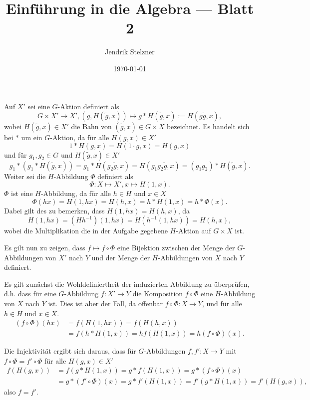 \documentclass[a4paper,10pt]{article}
\title{Einführung in die Algebra — Blatt 2}
\author{Jendrik Stelzner}
\date{\today}
\theoremstyle{definition}
\begin{document}
\maketitle





\section{}
Auf $X'$ sei eine $G$-Aktion definiert als
\[
 G \times X' \rightarrow X', (g,H(\tilde{g},x)) \mapsto g * H(\tilde{g},x) := H(g \tilde{g}, x),
\]
wobei $H(\tilde{g},x) \in X'$ die Bahn von $(\tilde{g},x) \in G \times X$ bezeichnet. Es handelt sich bei $*$ um ein $G$-Aktion, da für alle $H(g,x) \in X'$
\[
 1 * H(g,x) = H(1 \cdot g, x) = H(g,x)
\]
und für $g_1, g_2 \in G$ und $H(\tilde{g},x) \in X'$
\[
 g_1 * (g_1 * H(\tilde{g},x))
 = g_1 * H(g_2 \tilde{g}, x)
 = H(g_1 g_2 \tilde{g}, x)
 = (g_1 g_2) * H(\tilde{g},x).
\]
Weiter sei die $H$-Abbildung $\Phi$ definiert als
\[
 \Phi : X \mapsto X', x \mapsto H(1,x).
\]
$\Phi$ ist eine $H$-Abbildung, da für alle $h \in H$ und $x \in X$
\[
 \Phi(hx) = H(1,hx) = H(h,x) = h * H(1,x) = h * \Phi(x).
\]
Dabei gilt des zu bemerken, dass $H(1,hx) = H(h,x)$, da
\[
 H(1,hx) = (H h^{-1}) (1,hx) = H (h^{-1}(1,hx)) = H(h,x),
\]
wobei die Multiplikation die in der Aufgabe gegebene $H$-Aktion auf $G \times X$ ist.

Es gilt nun zu zeigen, dass $f \mapsto f \circ \Phi$ eine Bijektion zwischen der Menge der $G$-Abbildungen von $X'$ nach $Y$ und der Menge der $H$-Abbildungen von $X$ nach $Y$ definiert.

Es gilt zunächst die Wohldefiniertheit der induzierten Abbildung zu überprüfen, d.h. dass für eine $G$-Abbildung $f : X' \rightarrow Y$ die Komposition $f \circ \Phi$ eine $H$-Abbildung von $X$ nach $Y$ ist. Dies ist aber der Fall, da offenbar $f \circ \Phi : X \rightarrow Y$, und für alle $h \in H$ und $x \in X$.
\begin{align*}
 (f \circ \Phi)(hx)
 &= f( H(1,hx) )
 = f( H(h,x) ) \\
 &= f(h * H(1,x) )
 = h f( H(1,x) )
 = h (f \circ \Phi)(x).
\end{align*}

Die Injektivität ergibt sich daraus, dass für $G$-Abbildungen $f, f' : X \rightarrow Y$ mit $f \circ \Phi = f' \circ \Phi$ für alle $H(g,x) \in X'$
\begin{align*}
 f( H(g,x) )
 &= f( g * H(1,x) )
 = g * f( H(1,x) )
 = g * (f \circ \Phi)(x) \\
 &= g * (f' \circ \Phi)(x)
 = g * f'( H(1,x) )
 = f'( g * H(1,x) )
 = f'( H(g,x) ),
\end{align*}
also $f = f'$.
\end{document}
